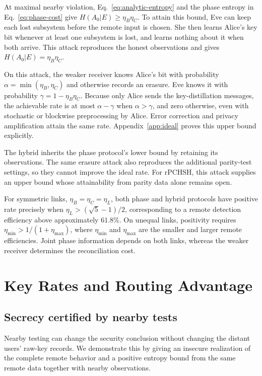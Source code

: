 \documentclass[aps,10pt,onecolumn,prx,superscriptaddress,longbibliography,nofootinbib]{revtex4-2}
\newcommand{\rPCHSH}{\mathrm{rPCHSH}}
\begin{document}
At maximal nearby violation, Eq.~\eqref{eq:analytic-entropy} and the phase entropy in Eq.~\eqref{eq:phase-cost} give $H(A_0|E)\geq\eta_B\eta_C$. To attain this bound, Eve can keep each lost subsystem before the remote input is chosen. She then learns Alice's key bit whenever at least one subsystem is lost, and learns nothing about it when both arrive. This attack reproduces the honest observations and gives $H(A_0|E)=\eta_B\eta_C$.

On this attack, the weaker receiver knows Alice's bit with probability $\alpha=\min(\eta_B,\eta_C)$ and otherwise records an erasure. Eve knows it with probability $\gamma=1-\eta_B\eta_C$. Because only Alice sends the key-distillation messages, the achievable rate is at most $\alpha-\gamma$ when $\alpha>\gamma$, and zero otherwise, even with stochastic or blockwise preprocessing by Alice. Error correction and privacy amplification attain the same rate. Appendix~\ref{app:ideal} proves this upper bound explicitly.

The hybrid inherits the phase protocol's lower bound by retaining its observations. The same erasure attack also reproduces the additional parity-test settings, so they cannot improve the ideal rate. For \(\rPCHSH\), this attack supplies an upper bound whose attainability from parity data alone remains open.

For symmetric links, $\eta_B=\eta_C=\eta_L$, both phase and hybrid protocols have positive rate precisely when $\eta_L>(\sqrt5-1)/2$, corresponding to a remote detection efficiency above approximately $61.8\%$. On unequal links, positivity requires $\eta_{\min}>1/(1+\eta_{\max})$, where $\eta_{\min}$ and $\eta_{\max}$ are the smaller and larger remote efficiencies. Joint phase information depends on both links, whereas the weaker receiver determines the reconciliation cost.

\section{Key Rates and Routing Advantage}\label{sec:results}

\subsection{Secrecy certified by nearby tests}\label{sec:routing-secrecy}

Nearby testing can change the security conclusion without changing the distant users' raw-key records. We demonstrate this by giving an insecure realization of the complete remote behavior and a positive entropy bound from the same remote data together with nearby observations.
\end{document}
